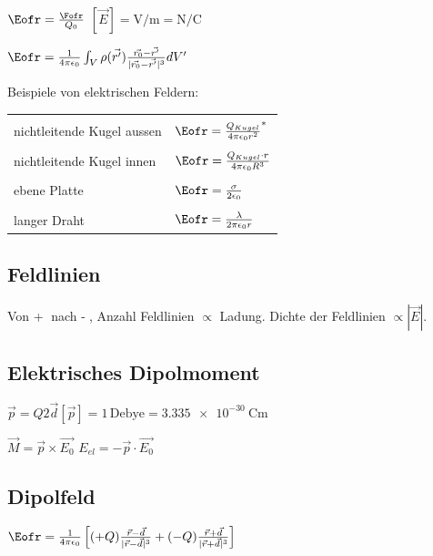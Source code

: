 \documentclass[10pt,a4paper]{scrartcl}
\begin{document}
\begin{multicols*}{3}
	\finn
	
	$\Eofr = \frac{\Fofr}{Q_0}$ \hfill $[\vec{E}]=\si{\volt\per\meter}=\si{\newton\per\coulomb}$
	
	$\Eofr=\frac{1}{4\pi\epsilon_0}\int_V{\rho(\vec{r'})\frac{\vec{r_0}-\vec{r'}}{|\vec{r_0}-\vec{r'}|^3}dV'}$
	
	\vspace{1ex}
	Beispiele von elektrischen Feldern:
	
	\begin{tabular*}{\linewidth}{l|l}
	\hline\\
	nichtleitende Kugel aussen&$\Eofr=\frac{Q_{Kugel}}{4\pi\epsilon_0r^2}^*$\\
	\hline\\
	nichtleitende Kugel innen&$\Eofr=\frac{Q_{Kugel}\cdot r}{4\pi\epsilon_0R^3}$\\
	\hline\\
	ebene Platte&$\Eofr=\frac{\sigma}{2\epsilon_0}$\\
	\hline\\
	langer Draht&$\Eofr=\frac{\lambda}{2\pi\epsilon_0r}$\\
	\hline
	\end{tabular*}

	
	\subsection{Feldlinien} 
	
	Von \textcircled{+} nach \textcircled{-}, Anzahl Feldlinien $\propto$ Ladung. Dichte der Feldlinien $\propto |\vec{E}|$.
	
	\subsection{Elektrisches Dipolmoment} 
	
	$\vec{p}= Q2\vec{d}$\hfill $[\vec{p}] = \mathrm{1\,Debye} = \SI{3.335e-30}{\coulomb\meter}$
	
	
	$\vec{M} = \vec{p}\times\vec{E_0}$ \hfill $E_{el}=-\vec{p}\cdot\vec{E_0}$
	
	\subsection{Dipolfeld}
	
	$\Eofr = \frac{1}{4\pi\epsilon_0}\left[(+Q)\frac{\vec{r}-\vec{d}}{|\vec{r}-\vec{d}|^3}+(-Q)\frac{\vec{r}+\vec{d}}{|\vec{r}+\vec{d}|^3}\right]$
	

\end{multicols*}
\end{document}
